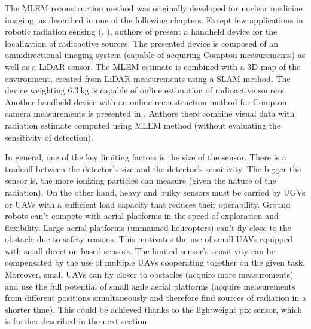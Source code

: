 The \ac{MLEM} reconstruction method was originally developed for nuclear medicine imaging, as described in one of the following chapters.
Except few applications in robotic radiation sensing (\cite{fuku_compton}, \cite{3D_compton_mobile_robot_2017}), authors of \cite{handheld_mlem_reconstruction}
present a handheld device for the localization of radioactive sources. 
The presented device is composed of an omnidirectional imaging system (capable of acquiring Compton measurements) as well as a \ac{LiDAR} sensor.
The \ac{MLEM} estimate is combined with a 3D map of the environment, created from \ac{LiDAR} measurements using a \ac{SLAM} method.
The device weighting $\SI{6.3}{\kilogram}$ is capable of online estimation of radioactive sources.
Another handheld device with an online reconstruction method for Compton camera measurements is presented in \cite{handheld_visual}.
Authors there combine visual data with radiation estimate computed using \ac{MLEM} method (without evaluating the sensitivity of detection).

In general, one of the key limiting factors is the size of the sensor.
There is a tradeoff between the detector's size and the detector's sensitivity.
The bigger the sensor is, the more ionizing particles can measure (given the nature of the radiation).
On the other hand, heavy and bulky sensors must be carried by \ac{UGV}s or \ac{UAV}s with a sufficient load capacity that reduces their operability. 
Ground robots can't compete with aerial platforms in the speed of exploration and flexibility. 
Large aerial platforms (unmanned helicopters) can't fly close to the obstacle due to safety reasons.
This motivates the use of small \ac{UAV}s equipped with small direction-based sensors.
The limited sensor's sensitivity can be compensated by the use of multiple \ac{UAV}s cooperating together on the given task.
Moreover, small \ac{UAV}s can fly closer to obstacles (acquire more measurements) and use the full potential of small agile aerial platforms (acquire measurements from different positions simultaneously and therefore find sources of radiation in a shorter time).
This could be achieved thanks to the lightweight \ac{pix} \cite{baca2019timepix} sensor, which is further described in the next section.

